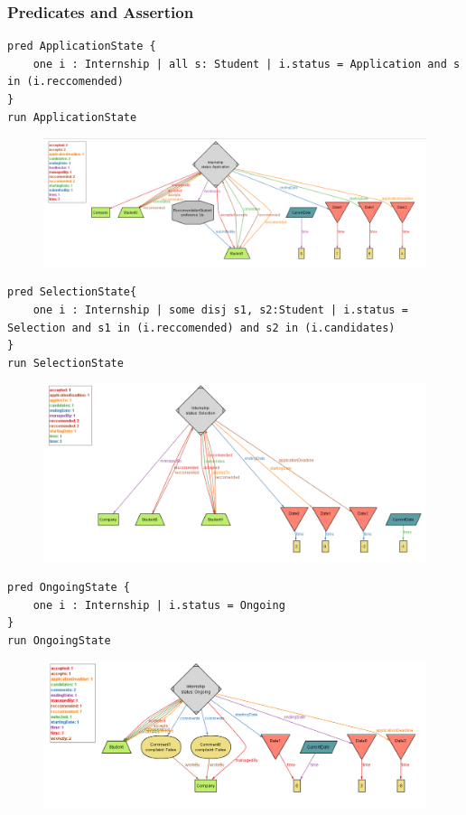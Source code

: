 \documentclass[a4paper,12pt]{article}
\begin{document}
\subsubsection{Predicates and Assertion}
\begin{lstlisting}
pred ApplicationState {
    one i : Internship | all s: Student | i.status = Application and s in (i.reccomended)
}
run ApplicationState
\end{lstlisting}
\begin{figure}[H]
    \centering
    \includegraphics[scale = 0.42]{figures/alloy/app_state_1.png}
    \centering
\end{figure}
\begin{lstlisting}
pred SelectionState{
    one i : Internship | some disj s1, s2:Student | i.status = Selection and s1 in (i.reccomended) and s2 in (i.candidates)  
}
run SelectionState
\end{lstlisting}
\begin{figure}[H]
    \centering
    \includegraphics[scale = 0.42]{figures/alloy/selects_2.png}
    \centering
\end{figure}
\begin{lstlisting}
pred OngoingState {
    one i : Internship | i.status = Ongoing
}
run OngoingState
\end{lstlisting}
\begin{figure}[H]
    \centering
    \includegraphics[scale = 0.42]{figures/alloy/ongoing_state.png}
    \centering
\end{figure}
\end{document}
